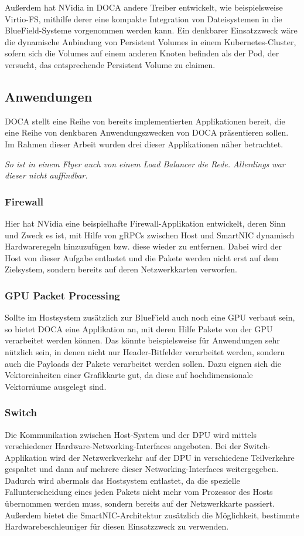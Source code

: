 Außerdem hat NVidia in DOCA andere Treiber entwickelt, wie beispielsweise Virtio-FS, mithilfe derer eine kompakte Integration von Dateisystemen in die BlueField-Systeme vorgenommen werden kann. Ein denkbarer Einsatzzweck wäre die dynamische Anbindung von Persistent Volumes in einem Kubernetes-Cluster, sofern sich die Volumes auf einem anderen Knoten befinden als der Pod, der versucht, das entsprechende Persistent Volume zu claimen.
\subsection{Anwendungen}
DOCA stellt eine Reihe von bereits implementierten Applikationen bereit, die eine Reihe von denkbaren Anwendungszwecken von DOCA präsentieren sollen. Im Rahmen dieser Arbeit wurden drei dieser Applikationen näher betrachtet.

\textit{So ist in einem Flyer auch von einem Load Balancer die Rede. Allerdings war dieser nicht auffindbar.}

\subsubsection{Firewall}
Hier hat NVidia eine beispielhafte Firewall-Applikation entwickelt, deren Sinn und Zweck es ist, mit Hilfe von gRPCs zwischen Host und SmartNIC dynamisch Hardwareregeln hinzuzufügen bzw. diese wieder zu entfernen. Dabei wird der Host von dieser Aufgabe entlastet und die Pakete werden nicht erst auf dem Zielsystem, sondern bereits auf deren Netzwerkkarten verworfen.

\subsubsection{GPU Packet Processing}
Sollte im Hostsystem zusätzlich zur BlueField auch noch eine GPU verbaut sein, so bietet DOCA eine Applikation an, mit deren Hilfe Pakete von der GPU verarbeitet werden können. Das könnte beispielsweise für Anwendungen sehr nützlich sein, in denen nicht nur Header-Bitfelder verarbeitet werden, sondern auch die Payloads der Pakete verarbeitet werden sollen. Dazu eignen sich die Vektoreinheiten einer Grafikkarte gut, da diese auf hochdimensionale Vektorräume ausgelegt sind. 

\subsubsection{Switch}
Die Kommunikation zwischen Host-System und der DPU wird mittels verschiedener Hardware-Networking-Interfaces angeboten. Bei der Switch-Applikation wird der Netzwerkverkehr auf der DPU in verschiedene Teilverkehre gespaltet und dann auf mehrere dieser Networking-Interfaces weitergegeben. Dadurch wird abermals das Hostsystem entlastet, da die spezielle Fallunterscheidung eines jeden Pakets nicht mehr vom Prozessor des Hosts übernommen werden muss, sondern bereits auf der Netzwerkkarte passiert. Außerdem bietet die SmartNIC-Architektur zusätzlich die Möglichkeit, bestimmte Hardwarebeschleuniger für diesen Einsatzzweck zu verwenden.